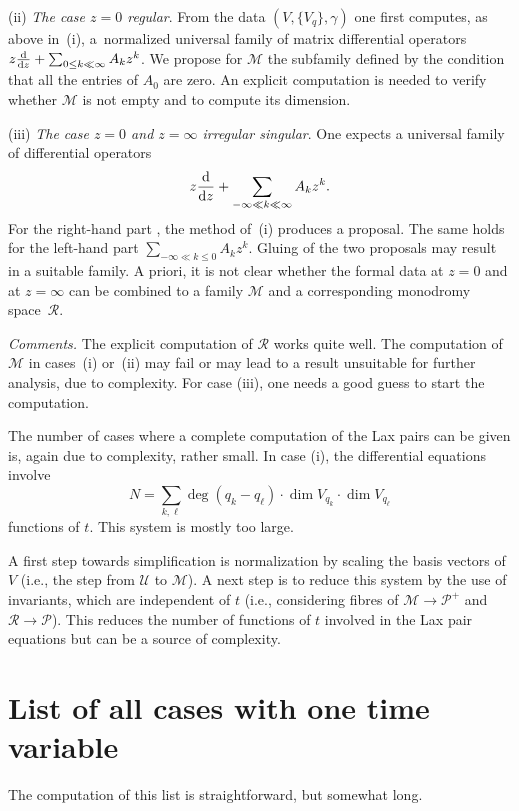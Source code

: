 \documentclass[10pt,a4paper]{amsart}
\numberwithin{equation}{section}
\begin{document}
\label{(ii)} (ii) {\it The case $z=0$ regular}. From the data $(V,\{V_q\},\gamma)$ one first computes, as above in~(i), a~normalized universal family
of matrix differential operators $z\frac{{\rm d}}{{\rm d}z}+\sum _{0\leq k \ll \infty}A_kz^k$. We propose for $\mathcal{M}$ the subfamily
defined by the condition that all the entries of $A_0$ are zero. An explicit computation is needed to verify
whether $\mathcal{M}$ is not empty and to compute its dimension.

 (iii) {\it The case $z=0$ and $z=\infty$ irregular singular}. One expects a universal family of differential operators
\[
z\frac{{\rm d}}{{\rm d}z}+\sum _{-\infty \ll k \ll \infty}A_kz^k.
\] For the right-hand part , the method of~(i) produces
a proposal. The same holds for the left-hand part $\sum _{-\infty \ll k \leq 0}A_kz^k$. Gluing of the two proposals may result in a suitable family.
A priori, it is not clear whether the formal data at $z=0$ and at $z=\infty$ can be combined to a family $\mathcal{M}$ and a
corresponding monodromy space~$\mathcal{R}$.

 {\it Comments.}
The explicit computation of $\mathcal{R}$ works quite well. The computation of $\mathcal{M}$ in cases~(i) or~(ii) may fail or
may lead to a result unsuitable for further analysis,
due to complexity. For case (iii), one needs a good guess to start the computation.

 The number of cases where
a complete computation of the Lax pairs can be given is, again due to complexity, rather small. In case (i), the differential
equations involve \[N=\sum _{k,\ell} \deg(q_k-q_\ell)\cdot \dim V_{q_k}\cdot \dim V_{q_\ell}\] functions of $t$. This system is mostly too
large.

A first step towards simplification is normalization by scaling the basis vectors of $V$ (i.e., the step from $\mathcal{U}$ to $\mathcal{M}$).
A next step is to reduce this system by the use of invariants, which are independent of $t$ (i.e., considering fibres of
$\mathcal{M}\rightarrow \mathcal{P}^+$ and $\mathcal{R}\rightarrow \mathcal{P}$). This reduces the number of functions of $t$ involved
in the Lax pair equations but can be a source of complexity.

\section{List of all cases with one time variable}\label{list}

 The computation of this list is straightforward, but somewhat long.
\end{document}
